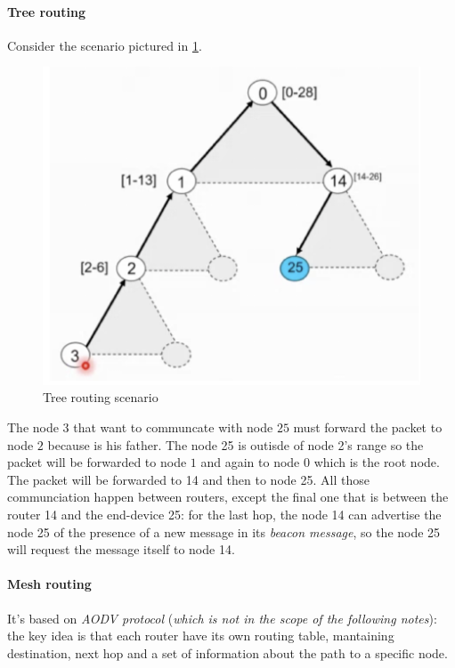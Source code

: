 \documentclass[10pt,a4paper]{report}
\theoremstyle{definition}
\begin{document}
\paragraph{Tree routing}\label{sec:tree-routing}
Consider the scenario pictured in \ref{tree-routing-scenario}.
\begin{figure}[h]
	\centering\includegraphics[scale=0.50]{images/Pasted image 20230524141226.png}
	\caption{Tree routing scenario}
	\label{tree-routing-scenario}
\end{figure}

The node $3$ that want to communcate with node $25$ must forward the packet to node $2$ because is his father. The node 25 is outisde of node 2's range so the packet will be forwarded to node $1$ and again to node 0 which is the root node. The packet will be forwarded to 14 and then to node 25.
All those communciation happen between routers, except the final one that is between the router 14 and the end-device 25: for the last hop, the node 14 can advertise the node 25 of the presence of a new message in its \textit{beacon message}, so the node 25 will request the message itself to node 14.
\paragraph{Mesh routing}\label{sec:mesh-routing}
It's based on \textit{AODV protocol} (\textit{which is not in the scope of the following notes}): the key idea is that each router have its own routing table, mantaining destination, next hop and a set of information about the path to a specific node.
\end{document}
